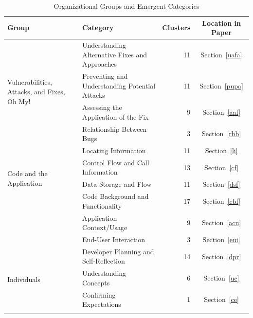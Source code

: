 \documentclass[conference]{IEEEtran}
\begin{document}
\begin{table} 
\centering
\caption{Organizational Groups and Emergent Categories}
\begin{tabular}{|l|l|r|c|}
\rowcolor{gray!50}
\hline
    Group											& Category										& Clusters		& Location in Paper	  	\\
    \hline			
    \multirow{4}{*}{Vulnerabilities, Attacks, and Fixes, Oh My!}
        											& Understanding Alternative Fixes and Approaches	& 11     		& Section~\ref{uafa}	\\

    												& Preventing and Understanding Potential Attacks	& 11     		& Section~\ref{pupa}		\\

    												& Assessing the Application of the Fix				& 9     		& Section~\ref{aaf}				\\

    												& Relationship Between Bugs							& 3     		& Section~\ref{rbb}			\\
    \hline
    \multirow{4}{*}{Code and the Application}	
    												& Locating Information 								& 11      		& Section~\ref{li}		\\

    												& Control Flow and Call Information					& 13     		& Section~\ref{cf}	\\

    												& Data Storage and Flow								& 11     		& Section~\ref{dsf}  	\\

    												& Code Background and Functionality	 				& 17     		& Section~\ref{cbf}			\\

    									& Application Context/Usage										& 9     		& Section~\ref{acu}			\\

    									& End-User Interaction											& 3     		& Section~\ref{eui}		\\
    \hline	
    \multirow{4}{*}{Individuals}	
    									& Developer Planning and Self-Reflection						& 14    		& Section~\ref{dpr}		\\

    									& Understanding Concepts										& 6 			& Section~\ref{uc}			\\

    									& Confirming Expectations					 					& 1				& Section~\ref{ce}  \\
    \hline
	\multirow{4}{*}{Problem Solving Support}


\end{tabular}
\end{table}
\end{document}
